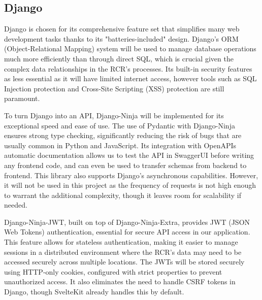 \subsection{Django} \label{Django}
Django is chosen for its comprehensive feature set that simplifies many web development tasks thanks to its "batteries-included" design. Django’s ORM (Object-Relational Mapping) system will be used to manage database operations much more efficiently than through direct SQL, which is crucial given the complex data relationships in the RCR’s processes. Its built-in security features as less essential as it will have limited internet access, however tools such as SQL Injection protection and Cross-Site Scripting (XSS) protection are still paramount.

To turn Django into an API, Django-Ninja will be implemented for its exceptional speed and ease of use. The use of Pydantic with Django-Ninja ensures strong type checking, significantly reducing the risk of bugs that are usually common in Python and JavaScript. Its integration with OpenAPIs automatic documentation allows us to test the API in SwaggerUI before writing any frontend code, and can even be used to transfer schemas from backend to frontend. This library also supports Django's asynchronous capabilities. However, it will not be used in this project as the frequency of requests is not high enough to warrant the additional complexity, though it leaves room for scalability if needed.

Django-Ninja-JWT, built on top of Django-Ninja-Extra, provides JWT (JSON Web Tokens) authentication, essential for secure API access in our application. This feature allows for stateless authentication, making it easier to manage sessions in a distributed environment where the RCR's data may need to be accessed securely across multiple locations. The JWTs will be stored securely using HTTP-only cookies, configured with strict properties to prevent unauthorized access. It also eliminates the need to handle CSRF tokens in Django, though SvelteKit already handles this by default.

